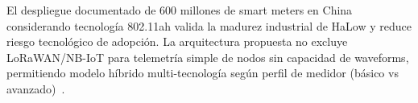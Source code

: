 El despliegue documentado de 600 millones de smart meters en China considerando tecnología 802.11ah valida la madurez industrial de HaLow y reduce riesgo tecnológico de adopción. La arquitectura propuesta no excluye LoRaWAN/NB-IoT para telemetría simple de nodos sin capacidad de waveforms, permitiendo modelo híbrido multi-tecnología según perfil de medidor (básico vs avanzado)~\cite{ugwuanyiSurveyIoTDeveloping2021}.

